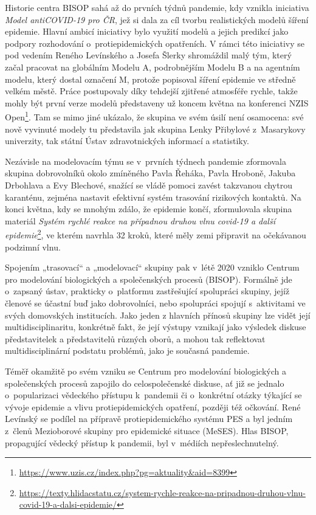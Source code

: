 Historie centra BISOP sahá až do prvních týdnů pandemie, kdy vznikla iniciativa {\em Model antiCOVID-19 pro ČR}, jež si dala za cíl tvorbu realistických modelů šíření epidemie. Hlavní ambicí iniciativy bylo využití modelů a jejich predikcí jako podpory rozhodování o~protiepidemických opatřeních. V rámci této iniciativy se pod vedením Reného Levínského a Josefa Šlerky shromáždil malý tým, který začal pracovat na globálním Modelu A, podrobnějším Modelu B a na agentním modelu, který dostal označení M, protože popisoval šíření epidemie ve středně velkém městě. Práce postupovaly díky tehdejší zjitřené atmosféře rychle, takže mohly být první verze modelů představeny už koncem května na konferenci NZIS Open\footnote{\url{https://www.uzis.cz/index.php?pg=aktuality&aid=8399}}. Tam se mimo jiné ukázalo, že skupina ve svém úsilí není osamocena: své nově vyvinuté modely tu představila jak skupina Lenky Přibylové z~Masarykovy univerzity, tak státní Ústav zdravotnických informací a statistiky. 


Nezávisle na modelovacím týmu se v~prvních týdnech pandemie zformovala skupina dobrovolníků okolo zmíněného Pavla Řeháka, Pavla Hroboně, Jakuba Drbohlava a Evy Blechové, snažící se vládě pomoci zavést takzvanou chytrou karanténu, zejména nastavit efektivní systém trasování rizikových kontaktů. Na konci května, kdy se mnohým zdálo, že epidemie končí, zformulovala skupina materiál {\em Systém rychlé reakce na případnou druhou vlnu covid-19 a další epidemie}\footnote{\url{https://texty.hlidacstatu.cz/system-rychle-reakce-na-pripadnou-druhou-vlnu-covid-19-a-dalsi-epidemie/}}, ve kterém navrhla 32 kroků, které měly zemi připravit na očekávanou podzimní vlnu. 

Spojením „trasovací“ a „modelovací“ skupiny pak v~létě 2020 vzniklo Centrum pro modelování biologických a společenských procesů (BISOP).
 Formálně jde o~zapsaný ústav, prakticky o~platformu zastřešující spolupráci skupiny, jejíž členové se účastní buď jako dobrovolníci, nebo spolupráci spojují s~aktivitami ve svých domovských institucích. Jako jeden z hlavních přínosů skupiny lze vidět její multidisciplinaritu, konkrétně fakt, že její výstupy vznikají jako výsledek diskuse představitelek a představitelů různých oborů, a mohou tak reflektovat multidisciplinární podstatu problémů, jako je současná pandemie.

Téměř okamžitě po svém vzniku se Centrum pro modelování biologických a společenských procesů zapojilo do celospolečenské diskuse, ať již se jednalo o~popularizaci vědeckého přístupu k~pandemii či o~konkrétní otázky týkající se vývoje epidemie a vlivu protiepidemických opatření, později též očkování. René Levínský se podílel na přípravě protiepidemického systému PES a byl jedním z~členů Mezioborové skupiny pro epidemické situace (MeSES). Hlas BISOP, propagující vědecký přístup k pandemii, byl v~médiích nepřeslechnutelný. 

